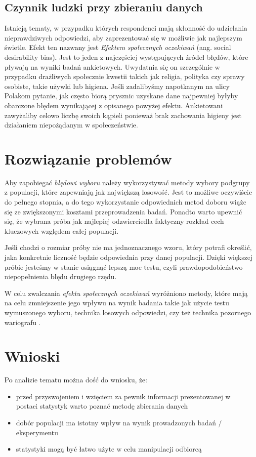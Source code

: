 \documentclass{classrep}
\begin{document}
{        \subsection{Czynnik ludzki przy zbieraniu danych}
        \label{wrong_examples:social-des} {
            Istnieją tematy, w przypadku których respondenci mają skłonność do udzielania nieprawdziwych odpowiedzi, aby zaprezentować się w możliwie jak najlepszym świetle. Efekt ten nazwany jest \textit{Efektem społecznych oczekiwań} (ang. social desirability bias). Jest to jeden z najczęściej występujących źródeł błędów, które pływają na wyniki badań ankietowych. Uwydatnia się on szczególnie w przypadku drażliwych społecznie kwestii takich jak religia, polityka czy sprawy osobiste, takie używki lub higiena. Jeśli zadalibyśmy napotkanym na ulicy Polakom pytanie, jak często biorą prysznic uzyskane dane najpewniej byłyby obarczone błędem wynikającej z opisanego powyżej efektu. Ankietowani zawyżaliby celowo liczbę swoich kąpieli ponieważ brak zachowania higieny jest działaniem niepożądanym w społeczeństwie.   
        }
    }

    \section{Rozwiązanie problemów}
    \label{good_examples} {
        Aby zapobiegać \textit{błędowi wyboru} należy wykorzystywać metody wybory podgrupy z populacji, które zapewniają jak największą losowość. Jest to możliwe oczywiście do pełnego stopnia, a do tego wykorzystanie odpowiednich metod doboru wiąże się ze zwiększonymi kosztami przeprowadzenia badań. Ponadto warto upewnić się, że wybrana próba jak najlepiej odzwierciedla faktyczny rozkład cech kluczowych względem całej populacji.
    
        Jeśli chodzi o rozmiar próby nie ma jednoznacznego wzoru, który potrafi określić, jaka konkretnie liczność będzie odpowiednia przy danej populacji. Dzięki większej próbie jesteśmy w stanie osiągnąć lepszą moc testu, czyli prawdopodobieństwo niepopełnienia błędu drugiego rzędu.
    
        W celu zwalczania \textit{efektu społecznych oczekiwań} wyróżniono metody, które mają na celu zmniejszenie jego wpływu na wynik badania takie jak użycie testu wymuszonego wyboru, technika losowych odpowiedzi, czy też technika pozornego wariografu \cite{coping}.  
    }

    \section{Wnioski} {
        Po analizie tematu można dość do wniosku, że: 
        \begin{itemize}
            \item przed przyswojeniem i wzięciem za pewnik informacji prezentowanej w postaci statystyk warto poznać metodę zbierania danych
            \item dobór populacji ma istotny wpływ na wynik prowadzonych badań / eksperymentu
            \item statystyki mogą być łatwo użyte w celu manipulacji odbiorcą
        \end{itemize}
    }
\end{document}
